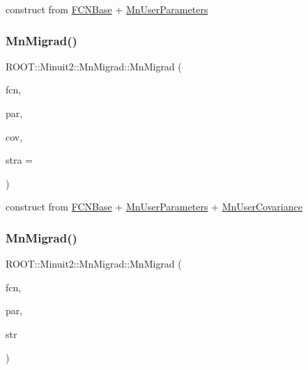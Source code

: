 construct from \mbox{\hyperlink{classROOT_1_1Minuit2_1_1FCNBase}{F\+C\+N\+Base}} + \mbox{\hyperlink{classROOT_1_1Minuit2_1_1MnUserParameters}{Mn\+User\+Parameters}} 

\mbox{\label{classROOT_1_1Minuit2_1_1MnMigrad_a02f279b4f09d995ed7c29abd203b9897}} 
\subsubsection{\texorpdfstring{MnMigrad()}{MnMigrad()}\hspace{0.1cm}{\footnotesize\ttfamily [5/39]}}
{\footnotesize\ttfamily R\+O\+O\+T\+::\+Minuit2\+::\+Mn\+Migrad\+::\+Mn\+Migrad (\begin{DoxyParamCaption}\item[{const \mbox{\hyperlink{classROOT_1_1Minuit2_1_1FCNBase}{F\+C\+N\+Base}} \&}]{fcn,  }\item[{const \mbox{\hyperlink{classROOT_1_1Minuit2_1_1MnUserParameters}{Mn\+User\+Parameters}} \&}]{par,  }\item[{const \mbox{\hyperlink{classROOT_1_1Minuit2_1_1MnUserCovariance}{Mn\+User\+Covariance}} \&}]{cov,  }\item[{unsigned int}]{stra = {} }\end{DoxyParamCaption})\hspace{0.3cm}{\ttfamily [inline]}}



construct from \mbox{\hyperlink{classROOT_1_1Minuit2_1_1FCNBase}{F\+C\+N\+Base}} + \mbox{\hyperlink{classROOT_1_1Minuit2_1_1MnUserParameters}{Mn\+User\+Parameters}} + \mbox{\hyperlink{classROOT_1_1Minuit2_1_1MnUserCovariance}{Mn\+User\+Covariance}} 

\mbox{\label{classROOT_1_1Minuit2_1_1MnMigrad_a6ee8b2dacc7c6255fdae62f851acaa48}} 
\subsubsection{\texorpdfstring{MnMigrad()}{MnMigrad()}\hspace{0.1cm}{\footnotesize\ttfamily [6/39]}}
{\footnotesize\ttfamily R\+O\+O\+T\+::\+Minuit2\+::\+Mn\+Migrad\+::\+Mn\+Migrad (\begin{DoxyParamCaption}\item[{const \mbox{\hyperlink{classROOT_1_1Minuit2_1_1FCNBase}{F\+C\+N\+Base}} \&}]{fcn,  }\item[{const \mbox{\hyperlink{classROOT_1_1Minuit2_1_1MnUserParameterState}{Mn\+User\+Parameter\+State}} \&}]{par,  }\item[{const \mbox{\hyperlink{classROOT_1_1Minuit2_1_1MnStrategy}{Mn\+Strategy}} \&}]{str }\end{DoxyParamCaption})\hspace{0.3cm}{\ttfamily [inline]}}



